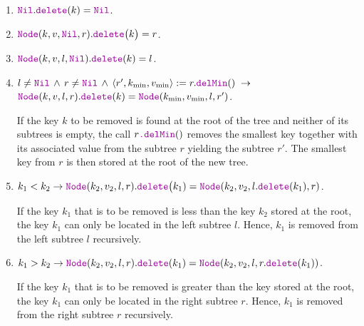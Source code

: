 \begin{enumerate}
\item $\mytt{Nil}.\mytt{delete}(k) = \mytt{Nil}$.
\item $\mytt{Node}(k,v,\mytt{Nil},r).\mytt{delete}\bigl(k\bigr) = r$.
\item $\mytt{Node}(k,v,l,\mytt{Nil}).\mytt{delete}(k) = l$.
\item $l \not= \mytt{Nil} \,\wedge\, r \not= \mytt{Nil} \,\wedge\, \langle r',k_{\textrm{min}}, v_{\textrm{min}}\rangle := r.\mytt{delMin}() \;\rightarrow$ \\[0.2cm]
      \hspace*{1.3cm}
      $\mytt{Node}(k,v,l,r).\mytt{delete}(k) = \mytt{Node}(k_{\textrm{min}},v_{\textrm{min}},l,r')$.
      
      If the key $k$ to be removed is found at the root of the tree and neither of its subtrees is
      empty, the call  $r\mytt{.}\mytt{delMin}()$ removes the smallest key together with its
      associated value from the subtree $r$ yielding the subtree $r'$.
      The smallest key from $r$ is then stored at the root of the new tree.

\item $k_1 < k_2 \rightarrow \mytt{Node}(k_2,v_2,l,r).\mytt{delete}\bigl(k_1) = 
       \mytt{Node}(k_2,v_2,l.\mytt{delete}(k_1),r)$.

       If the key $k_1$ that is to be removed is less than the key $k_2$ stored at the root, the key $k_1$ can only be
       located in the left subtree $l$.  Hence, $k_1$ is removed from the left subtree $l$ recursively.
\item $k_1 > k_2 \rightarrow \mytt{Node}(k_2,v_2,l,r).\mytt{delete}(k_1) = 
       \mytt{Node}(k_2,v_2,l,r.\mytt{delete}(k_1))$.

       If the key $k_1$ that is to be removed is greater than the key stored at the root, the key $k_1$ can only be
       located in the right subtree $r$.  Hence, $k_1$ is removed from the right subtree $r$ recursively.
\end{enumerate}

